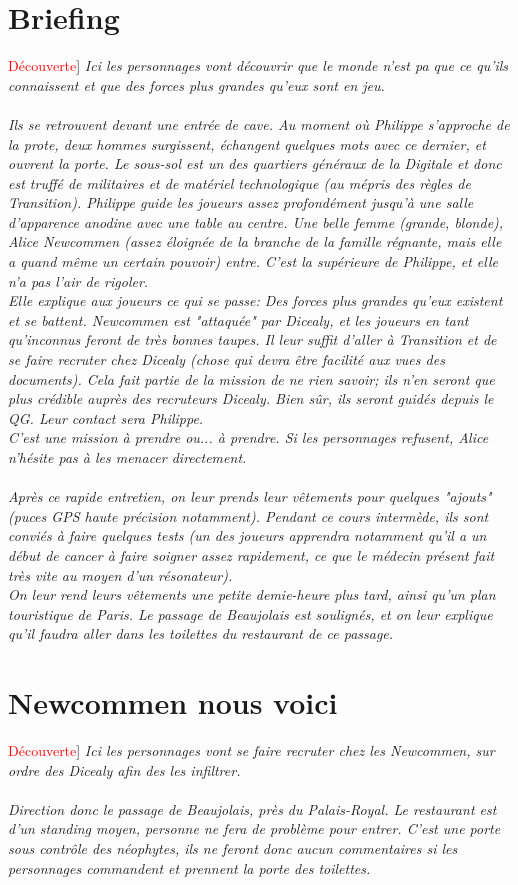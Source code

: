 \documentclass[10pt,a4paper,twocolumn]{article}
\newenvironment{lAbstract}[1]{{[}\textcolor{red}{#1}{]}\itshape}{\\ \\}
\begin{document}
\section{Briefing}
\begin{lAbstract}{Découverte}
Ici les personnages vont découvrir que le monde n'est pa que ce qu'ils connaissent et que des forces plus grandes qu'eux sont en jeu.
\end{lAbstract}
Ils se retrouvent devant une entrée de cave. Au moment où Philippe s'approche de la prote, deux hommes surgissent, échangent quelques mots avec ce dernier, et ouvrent la porte. Le sous-sol est un des quartiers généraux de la Digitale et donc est truffé de militaires et de matériel technologique (au mépris des règles de Transition). Philippe guide les joueurs assez profondément jusqu'à une salle d'apparence anodine avec une table au centre. Une belle femme (grande, blonde), Alice Newcommen (assez éloignée de la branche de la famille régnante, mais elle a quand même un certain pouvoir) entre. C'est la supérieure de Philippe, et elle n'a pas l'air de rigoler.\\
Elle explique aux joueurs ce qui se passe: Des forces plus grandes qu'eux existent et se battent. Newcommen est "attaquée" par Dicealy, et les joueurs en tant qu'inconnus feront de très bonnes taupes. Il leur suffit d'aller à Transition et de se faire recruter chez Dicealy (chose qui devra être facilité aux vues des documents). Cela fait partie de la mission de ne rien savoir; ils n'en seront que plus crédible auprès des recruteurs Dicealy. Bien sûr, ils seront guidés depuis le QG. Leur contact sera Philippe.\\
C'est une mission à prendre ou... à prendre. Si les personnages refusent, Alice n'hésite pas à les menacer directement.
\\
\\
Après ce rapide entretien, on leur prends leur vêtements pour quelques "ajouts" (puces GPS haute précision notamment). Pendant ce cours intermède, ils sont conviés à faire quelques tests (un des joueurs apprendra notamment qu'il a un début de cancer à faire soigner assez rapidement, ce que le médecin présent fait très vite au moyen d'un résonateur).
\\
On leur rend leurs vêtements une petite demie-heure plus tard, ainsi qu'un plan touristique de Paris. Le passage de Beaujolais est soulignés, et on leur explique qu'il faudra aller dans les toilettes du restaurant de ce passage.

\section{Newcommen nous voici}
\begin{lAbstract}{Découverte}
Ici les personnages vont se faire recruter chez les Newcommen, sur ordre des Dicealy afin des les infiltrer.
\end{lAbstract}
Direction donc le passage de Beaujolais, près du Palais-Royal. Le restaurant est d'un standing moyen, personne ne fera de problème pour entrer. C'est une porte sous contrôle des néophytes, ils ne feront donc aucun commentaires si les personnages commandent et prennent la porte des toilettes.
\end{document}
